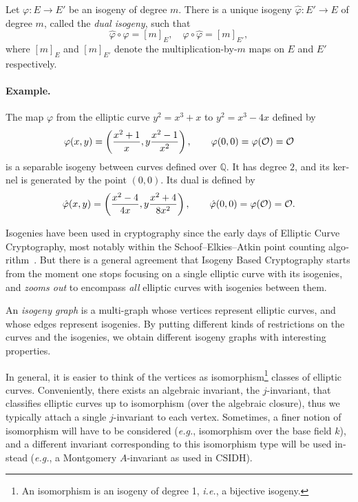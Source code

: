 \begin{otherlanguage}{english}
  \begin{theorem}
    Let $\varphi:E\to E'$ be an isogeny of degree $m$. %
    There is a unique isogeny $\hat{\varphi}:E'\to E$ of degree $m$,
    called the \emph{dual isogeny}, such that
    \[\hat{\varphi}\circ\varphi = [m]_E, \quad \varphi\circ\hat{\varphi} = [m]_{E'},\] %
    where $[m]_E$ and $[m]_{E'}$ denote the multiplication-by-$m$ maps
    on $E$ and $E'$ respectively.
  \end{theorem}

  \paragraph{Example.}
  The map $\varphi$ from the elliptic curve $y^2=x^3+x$ to $y^2=x^3-4x$
  defined by
  \begin{equation*}
      \varphi(x,y) = \left(\frac{x^2+1}{x},y\frac{x^2-1}{x^2}\right),\qquad
      \varphi(0,0) = \varphi(\mathcal{O}) = \mathcal{O}
  \end{equation*}
  is a separable isogeny between curves defined over $\mathbb{Q}$. %
  It has degree $2$, and its kernel is generated by the point
  $(0,0)$. %
  Its dual is defined by
  \begin{equation*}
      \hat\varphi(x,y) = \left(\frac{x^2-4}{4x},y\frac{x^2+4}{8x^2}\right),\qquad
      \hat\varphi(0,0) = \varphi(\mathcal{O}) = \mathcal{O}.
  \end{equation*}

  Isogenies have been used in cryptography since the early days of
  Elliptic Curve Cryptography, most notably within the
  Schoof--Elkies--Atkin point counting algorithm~\cite{schoof95}.  But
  there is a general agreement that Isogeny Based Cryptography starts
  from the moment one stops focusing on a single elliptic curve with
  its isogenies, and \emph{zooms out} to encompass \emph{all} elliptic
  curves with isogenies between them.

  An \emph{isogeny graph} is a multi-graph whose vertices represent
  elliptic curves, and whose edges represent isogenies. By putting
  different kinds of restrictions on the curves and the isogenies, we
  obtain different isogeny graphs with interesting properties.

  In general, it is easier to think of the vertices as
  isomorphism\footnote{An isomorphism is an isogeny of degree 1,
    \emph{i.e.}, a bijective isogeny.} classes of elliptic
  curves. Conveniently, there exists an algebraic invariant, the
  $j$-invariant, that classifies elliptic curves up to isomorphism
  (over the algebraic closure), thus we typically attach a single
  $j$-invariant to each vertex. Sometimes, a finer notion of
  isomorphism will have to be considered (\emph{e.g.}, isomorphism
  over the base field $k$), and a different invariant corresponding to
  this isomorphism type will be used instead (\emph{e.g.}, a
  Montgomery $A$-invariant as used in CSIDH).
  

\end{otherlanguage}
